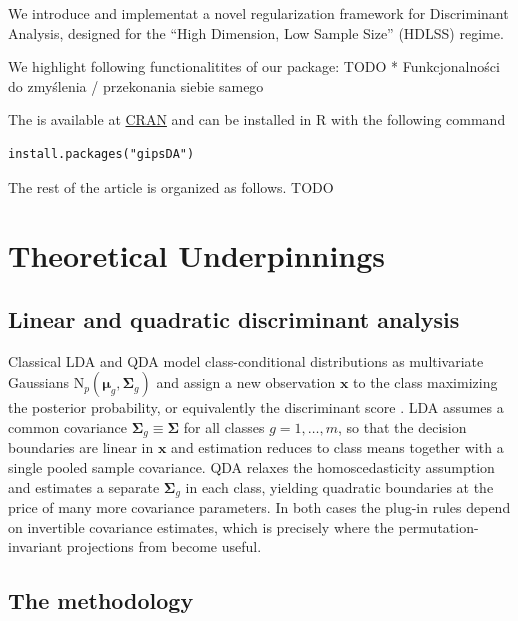 We introduce and implementat a novel regularization framework for Discriminant Analysis, designed for the ``High Dimension, Low Sample Size'' (HDLSS) regime.

We highlight following functionalitites of our package: TODO
* Funkcjonalności do zmyślenia / przekonania siebie samego

The  is available at \href{https://cran.r-project.org/web/packages/gipsDA/}{CRAN} and can be installed in R with the following command

\begin{verbatim}
install.packages("gipsDA")
\end{verbatim}

The rest of the article is organized as follows. TODO

\section{Theoretical Underpinnings}\label{theoretical-underpinnings}

\subsection{Linear and quadratic discriminant analysis}\label{linear-and-quadratic-discriminant-analysis}

Classical LDA and QDA model class-conditional distributions as multivariate Gaussians \(\mathrm{N}_p(\boldsymbol{\mu}_g,\boldsymbol{\Sigma}_g)\) and assign a new observation \(\mathbf{x}\) to the class maximizing the posterior probability, or equivalently the discriminant score \citep{elemstats, venables2002}. LDA assumes a common covariance \(\boldsymbol{\Sigma}_g\equiv\boldsymbol{\Sigma}\) for all classes \(g=1,\ldots,m\), so that the decision boundaries are linear in \(\mathbf{x}\) and estimation reduces to class means together with a single pooled sample covariance. QDA relaxes the homoscedasticity assumption and estimates a separate \(\boldsymbol{\Sigma}_g\) in each class, yielding quadratic boundaries at the price of many more covariance parameters. In both cases the plug-in rules depend on invertible covariance estimates, which is precisely where the permutation-invariant projections from  become useful.

\subsection{\texorpdfstring{The  methodology}{The  methodology}}\label{the-methodology}

